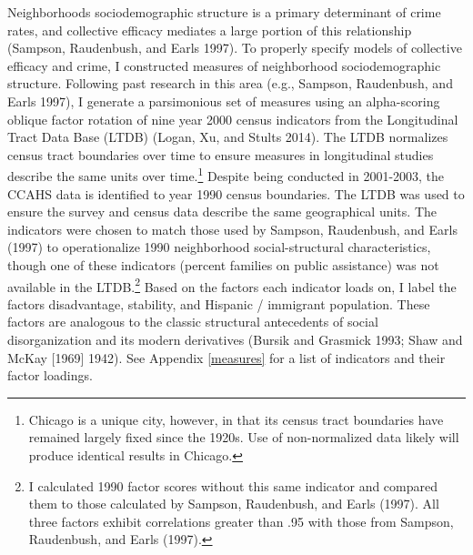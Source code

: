 \documentclass [11pt, proquest] {uwthesis}[2015/03/03]
\begin{document}
Neighborhoods sociodemographic structure is a primary determinant of crime rates, and collective efficacy mediates a large portion of this relationship (Sampson, Raudenbush, and Earls 1997). To properly specify models of collective efficacy and crime, I constructed measures of neighborhood sociodemographic structure. Following past research in this area (e.g., Sampson, Raudenbush, and Earls 1997), I generate a parsimonious set of measures using an alpha-scoring oblique factor rotation of nine year 2000 census indicators from the Longitudinal Tract Data Base (LTDB) (Logan, Xu, and Stults 2014). The LTDB normalizes census tract boundaries over time to ensure measures in longitudinal studies describe the same units over time.\footnote{Chicago is a unique city, however, in that its census tract boundaries have remained largely fixed since the 1920s. Use of non-normalized data likely will produce identical results in Chicago.} Despite being conducted in 2001-2003, the CCAHS data is identified to year 1990 census boundaries. The LTDB was used to ensure the survey and census data describe the same geographical units. The indicators were chosen to match those used by Sampson, Raudenbush, and Earls (1997) to operationalize 1990 neighborhood social-structural characteristics, though one of these indicators (percent families on public assistance) was not available in the LTDB.\footnote{I calculated 1990 factor scores without this same indicator and compared them to those calculated by Sampson, Raudenbush, and Earls (1997). All three factors exhibit correlations greater than .95 with those from Sampson, Raudenbush, and Earls (1997).} Based on the factors each indicator loads on, I label the factors disadvantage, stability, and Hispanic / immigrant population. These factors are analogous to the classic structural antecedents of social disorganization and its modern derivatives (Bursik and Grasmick 1993; Shaw and McKay {[}1969{]} 1942). See Appendix \ref{measures} for a list of indicators and their factor loadings.
\end{document}
